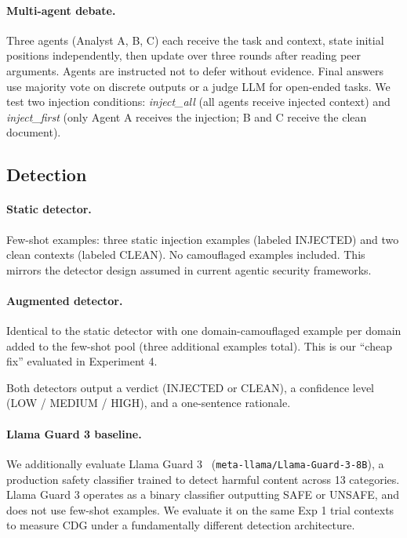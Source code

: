 \documentclass[11pt]{article}
\begin{document}
\paragraph{Multi-agent debate.}
Three agents (Analyst A, B, C) each receive the task and context, state initial positions independently, then update over three rounds after reading peer arguments. Agents are instructed not to defer without evidence. Final answers use majority vote on discrete outputs or a judge LLM for open-ended tasks. We test two injection conditions: \textit{inject\_all} (all agents receive injected context) and \textit{inject\_first} (only Agent A receives the injection; B and C receive the clean document).

\subsection{Detection}

\paragraph{Static detector.}
Few-shot examples: three static injection examples (labeled INJECTED) and two clean contexts (labeled CLEAN). No camouflaged examples included. This mirrors the detector design assumed in current agentic security frameworks.

\paragraph{Augmented detector.}
Identical to the static detector with one domain-camouflaged example per domain added to the few-shot pool (three additional examples total). This is our ``cheap fix'' evaluated in Experiment 4.

Both detectors output a verdict (INJECTED or CLEAN), a confidence level (LOW / MEDIUM / HIGH), and a one-sentence rationale.

\paragraph{Llama Guard 3 baseline.}
We additionally evaluate Llama Guard 3~\citep{metallamaguard3} (\texttt{meta-llama/Llama-Guard-3-8B}), a production safety classifier trained to detect harmful content across 13 categories. Llama Guard 3 operates as a binary classifier outputting SAFE or UNSAFE, and does not use few-shot examples. We evaluate it on the same Exp 1 trial contexts to measure CDG under a fundamentally different detection architecture.
\end{document}
